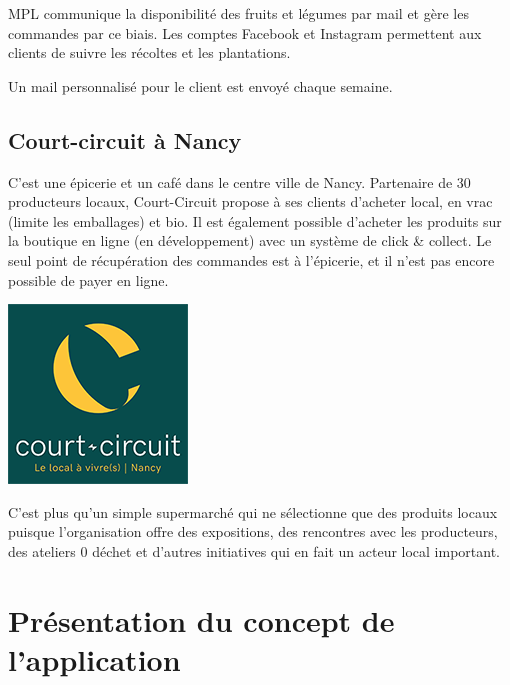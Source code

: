 \documentclass[11pt]{article}
\begin{document}
\vspace{0.1cm}

MPL communique la disponibilité des fruits et légumes par mail et gère les commandes par ce biais. Les comptes Facebook et Instagram permettent aux clients de suivre les récoltes et les plantations.  
 
Un mail personnalisé pour le client est envoyé chaque semaine.  


\subsection{Court-circuit à Nancy}

\hspace{-0.6cm}\begin{minipage}{.8\textwidth}\parindent17pt

C’est une épicerie et un café dans le centre ville de Nancy. Partenaire de 30 producteurs locaux, Court-Circuit propose à ses clients d’acheter local, en vrac (limite les emballages) et bio. Il est également possible d’acheter les produits sur la boutique en ligne (en développement) avec un système de click  \& collect. Le seul point de récupération des commandes est à l'épicerie, et il n’est pas encore possible de payer en ligne.


\end{minipage}
\hfill
\hspace{0.5cm}\begin{minipage}{.35\textwidth}%
\includegraphics[scale=0.7]{cc_logo.png}
\end{minipage}
\vspace{0.2cm}

C’est plus qu’un simple supermarché qui ne sélectionne que des produits locaux puisque l’organisation offre des expositions, des rencontres avec les producteurs, des ateliers 0 déchet et d’autres initiatives qui en fait un acteur local important. 


\section{Présentation du concept de l'application} 
\end{document}
